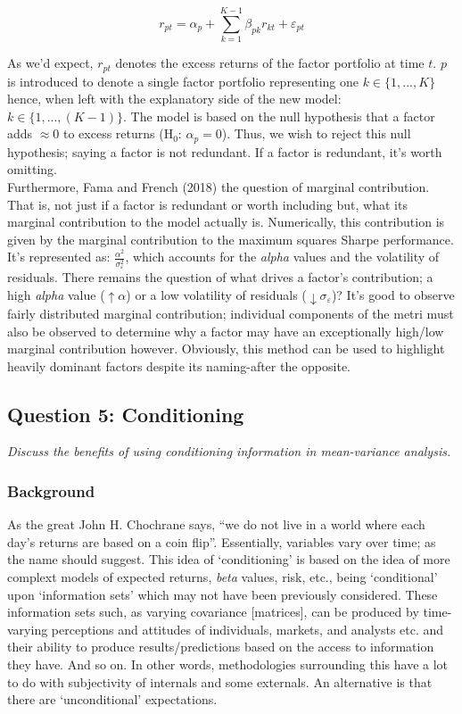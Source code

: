 \documentclass[11pt, english]{article}
\begin{document}
	$$r_{pt}=\alpha_p+\sum_{k=1}^{K-1}\beta_{pk}r_{kt}+\varepsilon_{pt}$$

        As we'd expect, $r_{pt}$ denotes the excess returns of the factor portfolio at time $t$. $p$ is introduced to denote a single factor portfolio representing one $k\in\{1,...,K\}$ hence, when left with the explanatory side of the new model: $k\in\{1,...,(K-1)\}$. The model is based on the null hypothesis that a factor adds $\approx0$ to excess returns (H$_0$: $\alpha_p=0$). Thus, we wish to reject this null hypothesis; saying a factor is not redundant. If a factor is redundant, it's worth omitting.\\

        Furthermore, Fama and French (2018) the question of marginal contribution. That is, not just if a factor is redundant or worth including but, what its marginal contribution to the model actually is. Numerically, this contribution is given by the marginal contribution to the maximum squares Sharpe performance. It's represented as: $\frac{\alpha^2}{\sigma_{\varepsilon}^2}$, which accounts for the \textit{alpha} values and the volatility of residuals. There remains the question of what drives a factor's contribution; a high \textit{alpha} value ($\uparrow\alpha$) or a low volatility of residuals ($\downarrow\sigma_{\varepsilon}$)? It's good to observe fairly distributed marginal contribution; individual components of the metri must also be observed to determine why a factor may have an exceptionally high/low marginal contribution however. Obviously, this method can be used to highlight heavily dominant factors despite its naming-after the opposite.

	\newpage

	\subsection{Question 5: Conditioning}

	\textit{Discuss the benefits of using conditioning information in mean-variance analysis.}

		\subsubsection*{Background}

	As the great John H. Chochrane says, ``we do not live in a world where each day's returns are based on a coin flip''. Essentially, variables vary over time; as the name should suggest. This idea of `conditioning' is based on the idea of more complext models of expected returns, \textit{beta} values, risk, etc., being `conditional' upon `information sets' which may not have been previously considered. These information sets such, as varying covariance [matrices], can be produced by time-varying perceptions and attitudes of individuals, markets, and analysts etc. and their ability to produce results/predictions based on the access to information they have. And so on. In other words, methodologies surrounding this have a lot to do with subjectivity of internals and some externals. An alternative is that there are `unconditional' expectations.\\
	
\end{document}
